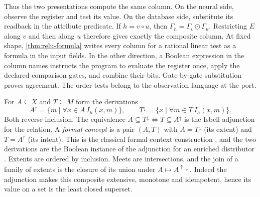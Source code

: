 \documentclass[11pt,a4paper]{article}
\theoremstyle{definition}
\theoremstyle{remark}\newaliascnt{remark}{theorem}
\numberwithin{equation}{section}
\begin{document}
Thus the two presentations compute the same column. On the neural side, observe the register and test its value. On the database side, substitute its readback in the attribute predicate. If $h=v\circ u$, then $\Gamma_h=\Gamma_v\odot\Gamma_u$. Restricting $E$ along $v$ and then along $u$ therefore gives exactly the composite column. At fixed shape, \cref{thm:relu-formula} writes every column for a rational linear test as a formula in the input fields. In the other direction, a Boolean expression in the column names instructs the program to evaluate the register once, apply the declared comparison gates, and combine their bits. Gate-by-gate substitution proves agreement. The order tests belong to the observation language at the port.

For $A\subseteq X$ and $T\subseteq M$ form the derivations
\[
 A^\uparrow=\{m\mid\forall x\in A\ I_h(x,m)\},\qquad
 T^\downarrow=\{x\mid\forall m\in T\ I_h(x,m)\}.
\]
Both reverse inclusion. The equivalence $A\subseteq T^\downarrow\iff T\subseteq A^\uparrow$ is the Isbell adjunction for the relation. A \emph{formal concept} is a pair $(A,T)$ with $A=T^\downarrow$ (its extent) and $T=A^\uparrow$ (its intent). This is the classical formal context construction \cite{fca-foundations}, and the two derivations are the Boolean instance of the adjunction for an enriched distributor \cite{isbell-distributors}. Extents are ordered by inclusion. Meets are intersections, and the join of a family of extents is the closure of its union under $A\mapsto A^{\uparrow\downarrow}$. Indeed the adjunction makes this composite extensive, monotone and idempotent, hence its value on a set is the least closed superset.
\end{document}

